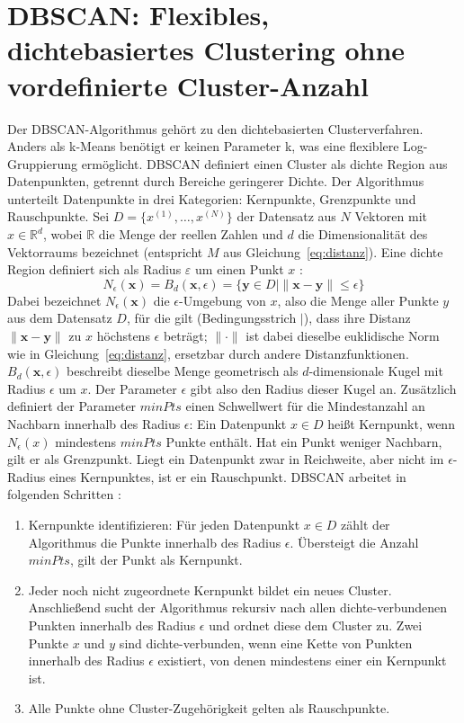 \section{DBSCAN: Flexibles, dichtebasiertes Clustering ohne vordefinierte Cluster-Anzahl}
\label{sec:dbscan}

Der DBSCAN-Algorithmus gehört zu den dichtebasierten Clusterverfahren. Anders als k-Means benötigt er keinen Parameter k, was eine flexiblere Log-Gruppierung ermöglicht. DBSCAN definiert einen Cluster als dichte Region aus Datenpunkten, getrennt durch Bereiche geringerer Dichte. Der Algorithmus unterteilt Datenpunkte in drei Kategorien: Kernpunkte, Grenzpunkte und Rauschpunkte. Sei $D = \{x^{(1)}, \dots, x^{(N)}\}$ der Datensatz aus $N$ Vektoren mit $x \in \mathbb{R}^d$, wobei $\mathbb{R}$ die Menge der reellen Zahlen und $d$ die Dimensionalität des Vektorraums bezeichnet (entspricht $M$ aus Gleichung~\eqref{eq:distanz}). Eine dichte Region definiert sich als Radius $\varepsilon$ um einen Punkt $x$ \cite{Mohammed_Wagner_2020}:
\begin{equation}
    N_{\epsilon}(\mathbf{x}) = B_{d}(\mathbf{x}, \epsilon) = \{ \mathbf{y} \in D \mid \| \mathbf{x} - \mathbf{y} \| \leq \epsilon \}
    \label{eq:eps_umgebung}
\end{equation}
Dabei bezeichnet $N_{\epsilon}(\mathbf{x})$ die $\epsilon$-Umgebung von $x$, also die Menge aller Punkte $y$ aus dem Datensatz $D$, für die gilt (Bedingungsstrich $\mid$), dass ihre Distanz $\| \mathbf{x} - \mathbf{y} \|$ zu $x$ höchstens $\epsilon$ beträgt; $\|\cdot\|$ ist dabei dieselbe euklidische Norm wie in Gleichung~\eqref{eq:distanz}, ersetzbar durch andere Distanzfunktionen. $B_{d}(\mathbf{x}, \epsilon)$ beschreibt dieselbe Menge geometrisch als $d$-dimensionale Kugel mit Radius $\epsilon$ um $x$. Der Parameter $\epsilon$ gibt also den Radius dieser Kugel an. Zusätzlich definiert der Parameter $\textit{minPts}$ einen Schwellwert für die Mindestanzahl an Nachbarn innerhalb des Radius $\epsilon$: Ein Datenpunkt $x \in D$ heißt Kernpunkt, wenn $N_\epsilon(x)$ mindestens $\textit{minPts}$ Punkte enthält. Hat ein Punkt weniger Nachbarn, gilt er als Grenzpunkt. Liegt ein Datenpunkt zwar in Reichweite, aber nicht im $\epsilon$-Radius eines Kernpunktes, ist er ein Rauschpunkt. DBSCAN arbeitet in folgenden Schritten \cite{geeksforgeeksDBSCANClustering}:
\begin{enumerate}
    \item Kernpunkte identifizieren: Für jeden Datenpunkt $x \in D$ zählt der Algorithmus die Punkte innerhalb des Radius $\epsilon$. Übersteigt die Anzahl $\textit{minPts}$, gilt der Punkt als Kernpunkt.
    \item Jeder noch nicht zugeordnete Kernpunkt bildet ein neues Cluster. Anschließend sucht der Algorithmus rekursiv nach allen dichte-verbundenen Punkten innerhalb des Radius $\epsilon$ und ordnet diese dem Cluster zu. Zwei Punkte $x$ und $y$ sind dichte-verbunden, wenn eine Kette von Punkten innerhalb des Radius $\epsilon$ existiert, von denen mindestens einer ein Kernpunkt ist.
    \item Alle Punkte ohne Cluster-Zugehörigkeit gelten als Rauschpunkte.
\end{enumerate}


